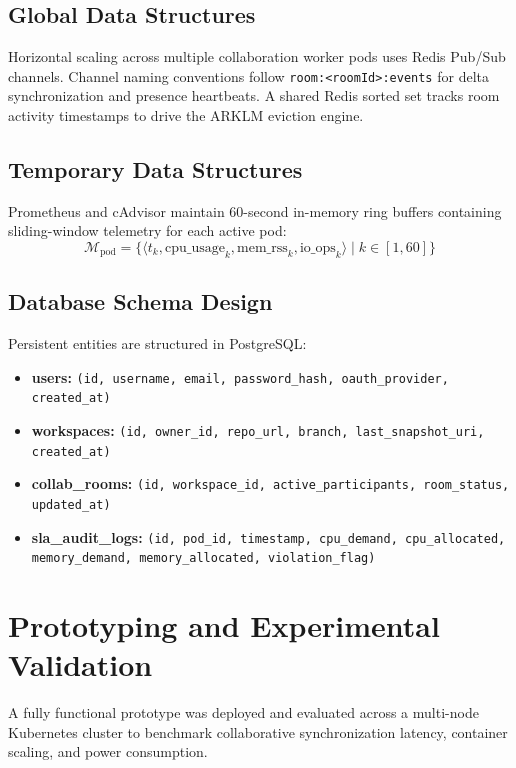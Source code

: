 \documentclass[12pt,a4paper]{report}
\begin{document}
	\subsection{Global Data Structures}
	Horizontal scaling across multiple collaboration worker pods uses Redis Pub/Sub channels. Channel naming conventions follow \texttt{room:<roomId>:events} for delta synchronization and presence heartbeats. A shared Redis sorted set tracks room activity timestamps to drive the ARKLM eviction engine.
	
	\subsection{Temporary Data Structures}
	Prometheus and cAdvisor maintain 60-second in-memory ring buffers containing sliding-window telemetry for each active pod:
	\begin{equation}
		\mathcal{M}_{\text{pod}} = \{\langle t_k, \text{cpu\_usage}_k, \text{mem\_rss}_k, \text{io\_ops}_k \rangle \mid k \in [1, 60]\}
	\end{equation}
	
	\subsection{Database Schema Design}
	Persistent entities are structured in PostgreSQL:
	\begin{itemize}
		\item \textbf{users:} \texttt{(id, username, email, password\_hash, oauth\_provider, created\_at)}
		\item \textbf{workspaces:} \texttt{(id, owner\_id, repo\_url, branch, last\_snapshot\_uri, created\_at)}
		\item \textbf{collab\_rooms:} \texttt{(id, workspace\_id, active\_participants, room\_status, updated\_at)}
		\item \textbf{sla\_audit\_logs:} \texttt{(id, pod\_id, timestamp, cpu\_demand, cpu\_allocated, memory\_demand, memory\_allocated, violation\_flag)}
	\end{itemize}
	
	\section{Prototyping and Experimental Validation}
	A fully functional prototype was deployed and evaluated across a multi-node Kubernetes cluster to benchmark collaborative synchronization latency, container scaling, and power consumption.
	
\end{document}
